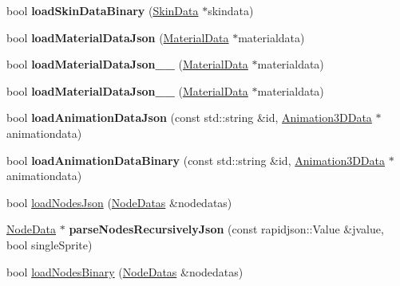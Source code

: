 \begin{DoxyCompactItemize}
\mbox{\label{classBundle3D_ac4db994035a70495cc80bf9c613f0633}} 
bool {\bfseries load\+Skin\+Data\+Binary} (\hyperlink{structSkinData}{Skin\+Data} $\ast$skindata)
\item 
\mbox{\label{classBundle3D_a32705826d8a0f4853a8194b99f897443}} 
bool {\bfseries load\+Material\+Data\+Json} (\hyperlink{structMaterialData}{Material\+Data} $\ast$materialdata)
\item 
\mbox{\label{classBundle3D_a54b6ae8b41c06cafdec15f0935527fad}} 
bool {\bfseries load\+Material\+Data\+Json\+\_\+\_} (\hyperlink{structMaterialData}{Material\+Data} $\ast$materialdata)
\item 
\mbox{\label{classBundle3D_a543832a83f1f45463d611e9390996108}} 
bool {\bfseries load\+Material\+Data\+Json\+\_\+\_} (\hyperlink{structMaterialData}{Material\+Data} $\ast$materialdata)
\item 
\mbox{\label{classBundle3D_ae6586629f1c634ad7f12b32cdd980a3e}} 
bool {\bfseries load\+Animation\+Data\+Json} (const std\+::string \&id, \hyperlink{structAnimation3DData}{Animation3\+D\+Data} $\ast$animationdata)
\item 
\mbox{\label{classBundle3D_ad558daa9851e1fde1f6e036fb27dfb2f}} 
bool {\bfseries load\+Animation\+Data\+Binary} (const std\+::string \&id, \hyperlink{structAnimation3DData}{Animation3\+D\+Data} $\ast$animationdata)
\item 
bool \hyperlink{classBundle3D_a3e4b6166d71360d79c4e043f780f6960}{load\+Nodes\+Json} (\hyperlink{structNodeDatas}{Node\+Datas} \&nodedatas)
\item 
\mbox{\label{classBundle3D_a87784c6f259bb7eea5b348a3c1c99ba7}} 
\hyperlink{structNodeData}{Node\+Data} $\ast$ {\bfseries parse\+Nodes\+Recursively\+Json} (const rapidjson\+::\+Value \&jvalue, bool single\+Sprite)
\item 
bool \hyperlink{classBundle3D_a83744280068184dce4d36dc6260e69b8}{load\+Nodes\+Binary} (\hyperlink{structNodeDatas}{Node\+Datas} \&nodedatas)
\item 
\mbox{\label{classBundle3D_a2c813f8b93878258beee445d23a4c6fd}} 

\end{DoxyCompactItemize}
